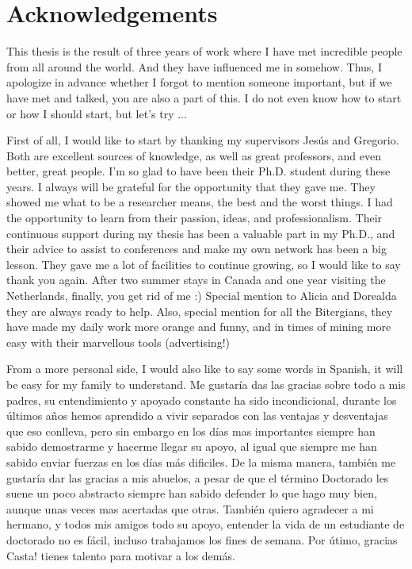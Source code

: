 \documentclass[a4paper, 12pt]{book}
\begin{document}

\chapter*{Acknowledgements}

This thesis is the result of three years of work where I have met incredible people from all around the world. And they have influenced me in somehow. Thus, I apologize in advance whether I forgot to mention someone important, but if we have met and talked, you are also a part of this. I do not even know how to start or how I should start, but let's try ...  

First of all, I would like to start by thanking my supervisors Jes\'us and Gregorio. Both are excellent sources of knowledge, as well as great professors, and even better, great people. I'm so glad to have been their Ph.D. student during these years. I always will be grateful for the opportunity that they gave me. They showed me what to be a researcher means, the best and the worst things. I had the opportunity to learn from their passion, ideas, and professionalism. Their continuous support during my thesis has been a valuable part in my Ph.D., and their advice to assist to conferences and make my own network has been a big lesson. They gave me a lot of facilities to continue growing, so I would like to say thank you again. After two summer stays in Canada and one year visiting the Netherlands, finally, you get rid of me :)  
Special mention to Alicia and Dorealda they are always ready to help. Also, special mention for all the Bitergians, they have made my daily work more orange and funny, and in times of mining more easy with their marvellous tools (advertising!) 

From a more personal side, I would also like to say some words in Spanish, it will be easy for my family to understand. Me gustar\'ia das las gracias sobre todo a mis padres, su entendimiento y apoyado constante ha sido incondicional, durante los \'ultimos a\~nos hemos aprendido a vivir separados con las ventajas y desventajas que eso conlleva, pero sin embargo en los d\'ias mas importantes siempre han sabido demostrarme y hacerme llegar su apoyo, al igual que siempre me han sabido enviar fuerzas en los d\'ias m\'as dificiles. De la misma manera, tambi\'en me gustar\'ia dar las gracias a mis abuelos, a pesar de que el t\'ermino Doctorado les suene un poco abstracto siempre han sabido defender lo que hago muy bien, aunque unas veces mas acertadas que otras. Tambi\'en quiero agradecer a mi hermano, y todos mis amigos todo su apoyo, entender la vida de un estudiante de doctorado no es f\'acil, incluso trabajamos los fines de semana. Por \'utimo, gracias Casta! tienes talento para motivar a los dem\'as.
\end{document}
